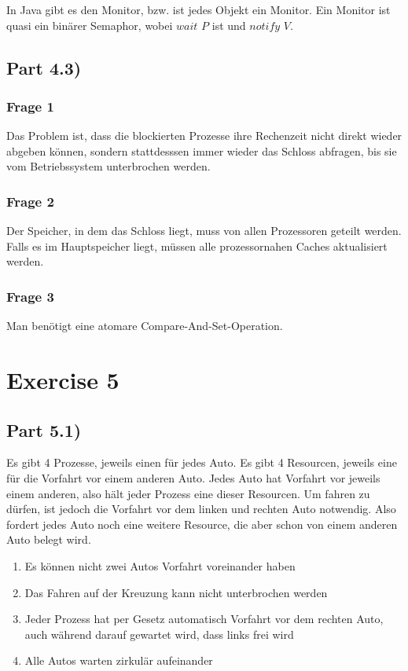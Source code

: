 \documentclass[10pt,a4paper]{article}
\begin{document}
In Java gibt es den Monitor, bzw. ist jedes Objekt ein Monitor.
Ein Monitor ist quasi ein binärer Semaphor, wobei $wait$ $P$ ist und $notify$ $V$.

\subsection*{Part 4.3)}

\subsubsection{Frage 1}

Das Problem ist, dass die blockierten Prozesse ihre Rechenzeit nicht direkt wieder abgeben können, sondern stattdesssen immer wieder das Schloss abfragen, bis sie vom Betriebssystem unterbrochen werden.

\subsubsection{Frage 2}

Der Speicher, in dem das Schloss liegt, muss von allen Prozessoren geteilt werden.
Falls es im Hauptspeicher liegt, müssen alle prozessornahen Caches aktualisiert werden.

\subsubsection{Frage 3}

Man benötigt eine atomare Compare-And-Set-Operation.

\section*{Exercise 5}

\subsection*{Part 5.1)}

Es gibt 4 Prozesse, jeweils einen für jedes Auto.
Es gibt 4 Resourcen, jeweils eine für die Vorfahrt vor einem anderen Auto.
Jedes Auto hat Vorfahrt vor jeweils einem anderen, also hält jeder Prozess eine dieser Resourcen.
Um fahren zu dürfen, ist jedoch die Vorfahrt vor dem linken und rechten Auto notwendig.
Also fordert jedes Auto noch eine weitere Resource, die aber schon von einem anderen Auto belegt wird.

\begin{enumerate}
\item Es können nicht zwei Autos Vorfahrt voreinander haben
\item Das Fahren auf der Kreuzung kann nicht unterbrochen werden
\item Jeder Prozess hat per Gesetz automatisch Vorfahrt vor dem rechten Auto, auch während darauf gewartet wird, dass links frei wird
\item Alle Autos warten zirkulär aufeinander
\end{enumerate}
\end{document}
